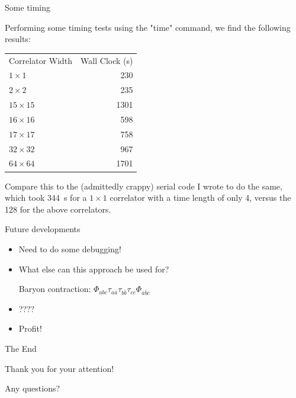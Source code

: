 \documentclass[xcolor=svgnames]{beamer}
\begin{document}
\begin{frame}{Some timing}

 Performing some timing tests using the "time" command, we find the following results:

 \begin{center}\begin{tabular}{l | r}
  Correlator Width & Wall Clock (s)\\
  $1 \times 1$ & 230\\
  $2 \times 2$ & 235\\
  $15 \times 15$ & 1301\\
  $16 \times 16$ & 598\\
  $17 \times 17$ & 758\\
  $32 \times 32$ & 967\\
  $64 \times 64$ & 1701
 \end{tabular}\end{center}

 Compare this to the (admittedly crappy) serial code I wrote to do the same, which took 344~s for a $1 \times 1$ correlator with a time length of only 4, versus the 128 for the above correlators.

\end{frame}


\begin{frame}{Future developments}

 \begin{itemize}
  \item Need to do some debugging!

  \item What else can this approach be used for?
 
 Baryon contraction: 
 $
 \Phi_{abc} \tau_{a\bar{a}} \tau_{b\bar{b}} \tau_{c\bar{c}} \Phi_{\bar{a}\bar{b}\bar{c}}
 $
 
  \item ????
 
  \item Profit!
 \end{itemize}

\end{frame}

\begin{frame}{The End}
\begin{center}
Thank you for your attention!

Any questions?
\end{center}
\end{frame}
\end{document}
